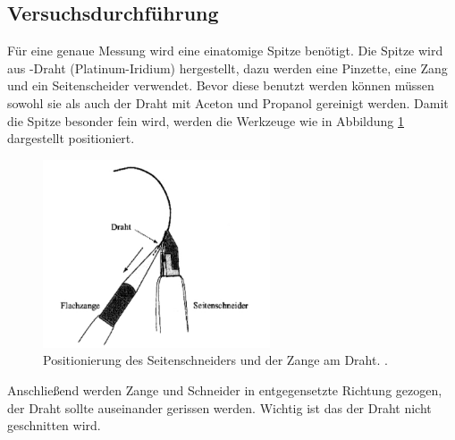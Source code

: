 \subsection{Versuchsdurchführung}

Für eine genaue Messung wird eine einatomige Spitze benötigt.
Die Spitze wird aus -Draht (Platinum-Iridium) hergestellt, dazu
werden eine Pinzette, eine Zang und ein Seitenscheider verwendet.
Bevor diese benutzt werden können müssen sowohl sie als auch der Draht mit Aceton und Propanol
gereinigt werden. Damit die Spitze besonder fein wird, werden die Werkzeuge wie in Abbildung \ref{fig: zange_schneider}
dargestellt positioniert.
\begin{figure}[!h]
  \centering
  \includegraphics[width=0.6\textwidth]{./pics/herstellung_spitze.png}
  \caption{Positionierung des Seitenschneiders und der Zange am Draht. \cite{anleitung_frankfurt}.}
  \label{fig: zange_schneider}
\end{figure}
Anschließend werden Zange und Schneider in entgegensetzte Richtung gezogen, der Draht sollte
auseinander gerissen werden. Wichtig ist das der Draht nicht geschnitten wird.

